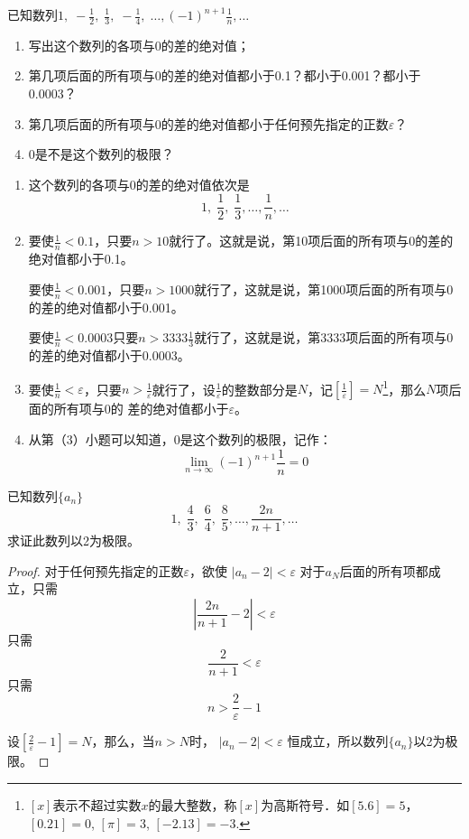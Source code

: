 \begin{example}
已知数列$1,\; -\frac{1}{2},\; \frac{1}{3},\; -\frac{1}{4},\; \ldots, (-1)^{n+1}\frac{1}{n},\ldots$
\begin{enumerate}[(1)]
\item 写出这个数列的各项与0的差的绝对值；
\item 第几项后面的所有项与0的差的绝对值都小于0.1？都小于0.001？都小于0.0003？
\item 第几项后面的所有项与0的差的绝对值都小于任何预先指定的正数$\varepsilon$？
\item 0是不是这个数列的极限？
\end{enumerate}
\end{example}

\begin{solution}
\begin{enumerate}[(1)]
    \item 这个数列的各项与0的差的绝对值依次是
\[1,\; \frac{1}{2},\; \frac{1}{3},\ldots,\frac{1}{n},\ldots\]
    \item 要使$\frac{1}{n}<0.1$，只要$n>10$就行了。这就是说，第10项后面的所有项与0的差的绝对值都小于0.1。
    
    要使$\frac{1}{n}<0.001$，只要$n>1000$就行了，这就是说，第1000项后面的所有项与0的差的绝对值都小于0.001。

    要使$\frac{1}{n}<0.0003$只要$n>3333\frac{1}{3}$就行了，这就是说，第3333项后面的所有项与0的差的绝对值都小于0.0003。
    \item 要使$\frac{1}{n}<\varepsilon$，只要$n>\frac{1}{\varepsilon}$就行了，设$\frac{1}{\varepsilon}$的整数部分是$N$，记$\left[\frac{1}{\varepsilon}\right]=N$\footnote{$[x]$表示不超过实数$x$的最大整数，称$[x]$为高斯符号．如$[5.6]=5$，$[0.21]=0$, $[\pi]=3$, $[-2.13]=-3$.}，那么$N$项后面的所有项与0的
    差的绝对值都小于$\varepsilon$。
\item 从第（3）小题可以知道，0是这个数列的极限，记作：
\[\lim_{n\to\infty}(-1)^{n+1}\frac{1}{n}=0\]
\end{enumerate}
\end{solution}    







\begin{example}
    已知数列$\{a_n\}$
\[1,\; \frac{4}{3},\; \frac{6}{4},\; \frac{8}{5},\ldots,\frac{2n}{n+1},\ldots\]
求证此数列以2为极限。
\end{example}

\begin{proof}
对于任何预先指定的正数$\varepsilon$，欲使
$|a_n-2|<\varepsilon$
对于$a_N$后面的所有项都成立，只需
\[\left|\frac{2n}{n+1}-2\right|<\varepsilon\]
只需
\[\frac{2}{n+1}<\varepsilon\]
只需
\[n>\frac{2}{\varepsilon}-1\]

设$\left[\frac{2}{\varepsilon}-1\right]=N$，那么，当$n>N$时，
$|a_n-2|<\varepsilon$
恒成立，所以数列$\{a_n\}$以2为极限。
\end{proof}



